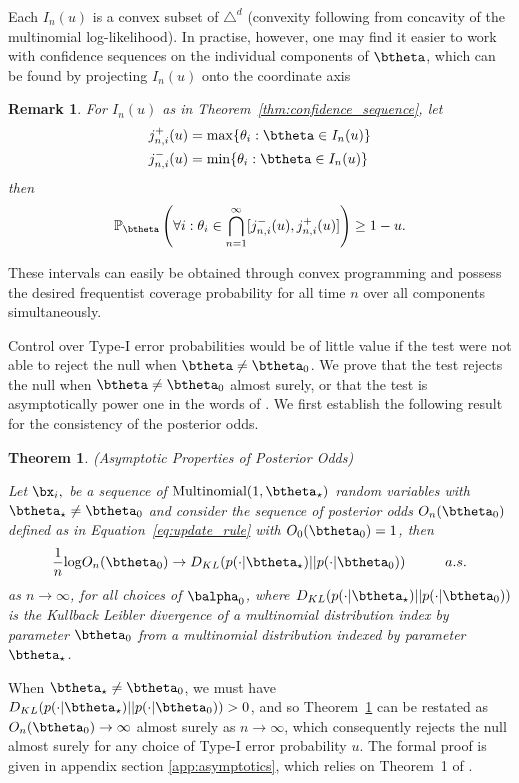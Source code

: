\documentclass[11pt]{article}
\def\log{{\rm log}}
\newtheorem{thm}{Theorem}[section]
\newtheorem{remark}{Remark}[section]
\begin{document}
\noindent Each $I_n(u)$ is a convex subset of $\triangle^d$ (convexity following from concavity of the multinomial log-likelihood). 
In practise, however, one may find it easier to work with confidence sequences on the individual components of $\btheta$, which can be found by projecting $I_n(u)$ onto the coordinate axis
\begin{remark}
For $I_n(u)$ as in Theorem~\ref{thm:confidence_sequence}, let
\begin{align*}
j_{n,i}^+(u) &= \max \{\theta_i : \btheta \in I_n(u)\}\\
j_{n,i}^-(u) &= \min \{\theta_i : \btheta \in I_n(u)\}\\
\end{align*}
then 
\begin{equation}
  \label{eq:marginal_confidence_sequence}
  \mathbb{P}_{\btheta}\left(
    \forall i: \theta_i \in \bigcap_{n=1}^{\infty} [j_{n,i}^-(u),j_{n,i}^+(u)]
  \right) \geq 1- u.
\end{equation} 
\end{remark}
\noindent These intervals can easily be obtained through convex programming and possess the desired frequentist coverage probability for all time $n$ over all components simultaneously.

Control over Type-I error probabilities would be of little value if the test were not able to reject the null when $\btheta \neq \btheta_0$. We prove that the test rejects the null when $\btheta \neq \btheta_0$ almost surely, or that the test is asymptotically power one in the words of \cite{robbins}.
We first establish the following result for the consistency of the posterior odds.
\begin{thm}(Asymptotic Properties of Posterior Odds)
  
  \label{thm:consistency}
\noindent Let $\bx_i,$ be a sequence of $\text{Multinomial}(1,\btheta_{\star})$ random variables with $\btheta_{\star} \neq \btheta_0$ and consider the sequence of posterior odds $O_n(\btheta_0)$ defined as in Equation~\ref{eq:update_rule} with $O_0(\btheta_0)=1$, then
\begin{equation}
  \label{eq:consistency}
  \frac{1}{n} \log O_n(\btheta_0) \rightarrow D_{KL}(p(\cdot|\btheta_{\star}) || p(\cdot|\btheta_0)) \hspace{1cm} a.s.
\end{equation}
as $ n \rightarrow \infty$, for all choices of $\balpha_0$, where $D_{KL}(p(\cdot|\btheta_{\star}) || p(\cdot|\btheta_0))$ is the Kullback Leibler divergence of a multinomial distribution index by parameter $\btheta_0$ from a multinomial distribution indexed by parameter $\btheta_{\star}$.
\end{thm}
\noindent When $\btheta_{\star} \neq \btheta_0$, we must have $D_{KL}(p(\cdot|\btheta_{\star}) || p(\cdot|\btheta_0)) > 0$, and so Theorem~\ref{thm:consistency} can be restated as $O_n(\btheta_0) \rightarrow \infty$ almost surely as $ n \rightarrow \infty$, which consequently rejects the null almost surely for any choice of Type-I error probability $u$.
The formal proof is given in appendix section \ref{app:asymptotics}, which relies on Theorem~1 of \cite{walker}.
\end{document}
